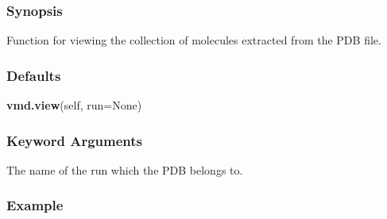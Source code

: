 \subsubsection{Synopsis}

Function for viewing the collection of molecules extracted from the PDB file.



\subsubsection{Defaults}

\textsf{\textbf{vmd.view}(self, run=None)}


\subsubsection{Keyword Arguments}

  The name of the run which the PDB belongs to. 




\subsubsection{Example}



